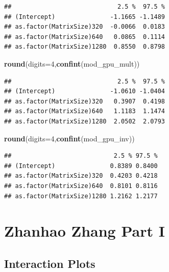 \documentclass[
]{article}
\newenvironment{Shaded}{\begin{snugshade}}{\end{snugshade}}
\newcommand{\DataTypeTok}[1]{\textcolor[rgb]{0.13,0.29,0.53}{#1}}
\newcommand{\DecValTok}[1]{\textcolor[rgb]{0.00,0.00,0.81}{#1}}
\newcommand{\KeywordTok}[1]{\textcolor[rgb]{0.13,0.29,0.53}{\textbf{#1}}}
\newcommand{\NormalTok}[1]{#1}
\begin{document}
\begin{verbatim}
##                             2.5 %  97.5 %
## (Intercept)               -1.1665 -1.1489
## as.factor(MatrixSize)320  -0.0066  0.0183
## as.factor(MatrixSize)640   0.0865  0.1114
## as.factor(MatrixSize)1280  0.8550  0.8798
\end{verbatim}

\begin{Shaded}
\begin{Highlighting}[]
\KeywordTok{round}\NormalTok{(}\DataTypeTok{digits=}\DecValTok{4}\NormalTok{,}\KeywordTok{confint}\NormalTok{(mod\_gpu\_mult))}
\end{Highlighting}
\end{Shaded}

\begin{verbatim}
##                             2.5 %  97.5 %
## (Intercept)               -1.0610 -1.0404
## as.factor(MatrixSize)320   0.3907  0.4198
## as.factor(MatrixSize)640   1.1183  1.1474
## as.factor(MatrixSize)1280  2.0502  2.0793
\end{verbatim}

\begin{Shaded}
\begin{Highlighting}[]
\KeywordTok{round}\NormalTok{(}\DataTypeTok{digits=}\DecValTok{4}\NormalTok{,}\KeywordTok{confint}\NormalTok{(mod\_gpu\_inv))}
\end{Highlighting}
\end{Shaded}

\begin{verbatim}
##                            2.5 % 97.5 %
## (Intercept)               0.8389 0.8400
## as.factor(MatrixSize)320  0.4203 0.4218
## as.factor(MatrixSize)640  0.8101 0.8116
## as.factor(MatrixSize)1280 1.2162 1.2177
\end{verbatim}

\hypertarget{zhanhao-zhang-part-i}{%
\section{Zhanhao Zhang Part I}\label{zhanhao-zhang-part-i}}

\hypertarget{interaction-plots}{%
\subsection{Interaction Plots}\label{interaction-plots}}
\end{document}
